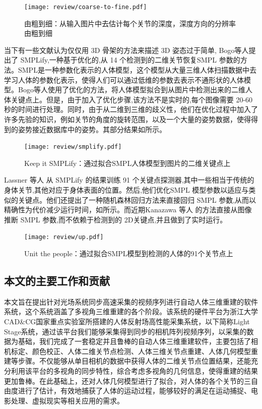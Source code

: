\begin{figure}[ht]
    \centering
    \texttt{[image: review/coarse-to-fine.pdf]}
    \caption{由粗到细\cite{pavlakos2017coarse}：从输入图片中去估计每个关节的深度，深度方向的分辨率由粗到细}\label{fig:c2f}
\end{figure}

当下有一些文献认为仅仅用 3D 骨架的方法来描述 3D 姿态过于简单, Bogo等人\cite{bogo2016keep}提出了 SMPLify,一种基于优化的,从 14 个检测到的二维关节恢复SMPL 参数的方法。SMPL\cite{loper2015smpl}是一种参数化表示的人体模型，这个模型从大量三维人体扫描数据中去学习人体的参数化表示，使得人们可以通过低维的参数去表示不通形状的人体模型。Bogo等人\cite{bogo2016keep}使用了优化的方法，将人体模型拟合到从图片中检测出来的二维人体关键点上。但是，由于加入了优化步骤,该方法不是实时的,每个图像需要 20-60 秒的时间进行处理。同时，由于从二维到三维的歧义性，他们在优化过程中加入了许多先验的知识，例如关节的角度的旋转范围，以及一个大量的姿势数据，使得得到的姿势接近数据库中的姿势。其部分结果如所示。 

\begin{figure}[ht]
    \centering
    \texttt{[image: review/smplify.pdf]}
    \caption{Keep it SMPLify\cite{bogo2016keep}：通过拟合SMPL人体模型到图片的二维关键点上}\label{fig:smpl1}
\end{figure}

Lassner \cite{lassner2017unite} 等人 从 SMPLify 的结果训练 91 个关键点探测器,其中一些相当于传统的身体关节,其他对应于身体表面的位置。然后,他们优化SMPL 模型参数以适应与\cite{bogo2016keep}类似的关键点。他们还提出了一种随机森林回归方法来直接回归 SMPL 参数,从而以精确性为代价减少运行时间，如所示。而近期Kanazawa 等人\cite{kanazawa2018end} 的方法直接从图像推断 SMPL 参数,而不依赖于检测到的 2D关键点,并且做到了实时运行。

\begin{figure}[ht]
    \centering
    \texttt{[image: review/up.pdf]}
    \caption{Unit the people\cite{lassner2017unite}：通过拟合SMPL模型到检测的人体的91个关节点上}\label{fig:up}
\end{figure}

\subsection{本文的主要工作和贡献}

本文旨在提出针对光场系统同步高速采集的视频序列进行自动人体三维重建的软件系统，这个系统涵盖了多视角三维重建的各个阶段。该系统的硬件平台为浙江大学CAD\&CG国家重点实验室所搭建的人体反射场高性能采集系统，以下简称Light Stage系统，通过该平台我们能够采集得到同步的相机阵列视频序列，以采集的数据为基础，我们完成了一套稳定并且鲁棒的自动人体三维重建软件，主要包括了相机标定、颜色校正、人体二维关节点检测、人体三维关节点重建、人体几何模型重建等步骤。不仅能够从单目相机的数据中获得人体的二维关节点位置结果，还能充分利用该平台的多视角的同步特性，综合考虑多视角的几何信息，使得重建的结果更加鲁棒。在此基础上，还对人体几何模型进行了拟合，对人体的各个关节的三自由度进行了估计，有效地捕获了人体的运动过程，能够较好的满足在运动捕捉、电影处理、虚拟现实等相关应用的需求。

